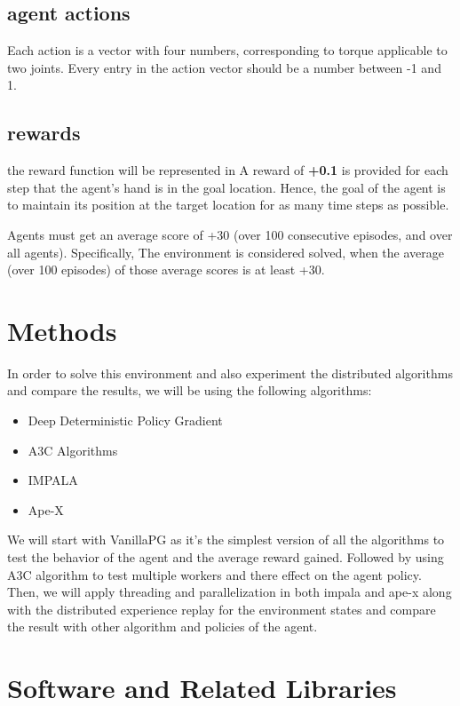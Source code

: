 \subsection{agent actions}
Each action is a vector with four numbers, corresponding to torque applicable to two joints. Every entry in the action vector should be a number between -1 and 1.

\subsection{rewards}

the reward function will be represented in A reward of \textbf{+0.1} is provided for each step that the agent's hand is in the goal location.
Hence, the goal of the agent is to maintain its position at the target location for as many time steps as possible.

Agents must get an average score of +30 (over 100 consecutive episodes, and over all agents). Specifically,
The environment is considered solved, when the average (over 100 episodes) of those average scores is at least +30.

\section{Methods}
In order to solve this environment and also experiment the distributed algorithms and compare the results, we will be using the following algorithms:

\begin{itemize}
    \item Deep Deterministic Policy Gradient
    \item A3C Algorithms
    \item IMPALA
    \item Ape-X 
\end{itemize}

We will start with VanillaPG as it's the simplest version of all the algorithms to test the behavior of the agent and the average reward gained. Followed by using A3C algorithm to test multiple workers and there effect on the agent policy. Then, we will apply threading and parallelization in both impala and ape-x along with the distributed experience replay for the environment states and compare the result with other algorithm and policies of the agent.

\section{Software and Related Libraries}

